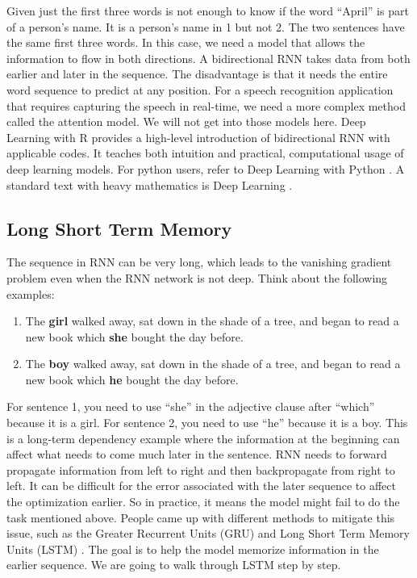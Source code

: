 \documentclass[
  12pt,
]{krantz}
\providecommand{\tightlist}{%
  \setlength{\itemsep}{0pt}\setlength{\parskip}{0pt}}
\begin{document}
Given just the first three words is not enough to know if the word ``April'' is part of a person's name. It is a person's name in 1 but not 2. The two sentences have the same first three words. In this case, we need a model that allows the information to flow in both directions. A bidirectional RNN takes data from both earlier and later in the sequence. The disadvantage is that it needs the entire word sequence to predict at any position. For a speech recognition application that requires capturing the speech in real-time, we need a more complex method called the attention model. We will not get into those models here. Deep Learning with R \citep{deeplearningr18} provides a high-level introduction of bidirectional RNN with applicable codes. It teaches both intuition and practical, computational usage of deep learning models. For python users, refer to Deep Learning with Python \citep{deeplearningpy17}. A standard text with heavy mathematics is Deep Learning \citep{Goodfellow-et-al-2016}.

\hypertarget{lstm}{%
\subsection{Long Short Term Memory}\label{lstm}}

The sequence in RNN can be very long, which leads to the vanishing gradient problem even when the RNN network is not deep. Think about the following examples:

\begin{enumerate}
\def\labelenumi{\arabic{enumi}.}
\tightlist
\item
  The \textbf{girl} walked away, sat down in the shade of a tree, and began to read a new book which \textbf{she} bought the day before.
\item
  The \textbf{boy} walked away, sat down in the shade of a tree, and began to read a new book which \textbf{he} bought the day before.
\end{enumerate}

For sentence 1, you need to use ``she'' in the adjective clause after ``which'' because it is a girl. For sentence 2, you need to use ``he'' because it is a boy. This is a long-term dependency example where the information at the beginning can affect what needs to come much later in the sentence. RNN needs to forward propagate information from left to right and then backpropagate from right to left. It can be difficult for the error associated with the later sequence to affect the optimization earlier. So in practice, it means the model might fail to do the task mentioned above. People came up with different methods to mitigate this issue, such as the Greater Recurrent Units (GRU) \citep{chung2014empirical} and Long Short Term Memory Units (LSTM) \citep{lstm1997}. The goal is to help the model memorize information in the earlier sequence. We are going to walk through LSTM step by step.
\end{document}
